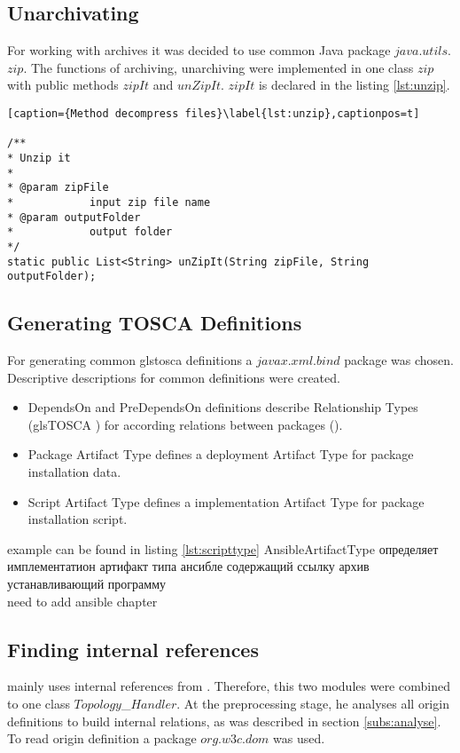 \subsection*{Unarchivating}
For working with archives it was decided to use common Java package $java$.$utils$.$zip$.
The functions of archiving, unarchiving were implemented in one class $zip$ with public methods $zipIt$ and $unZipIt$. $zipIt$ is declared in the listing \ref{lst:unzip}.
\begin{lstlisting}[caption={Method decompress files}\label{lst:unzip},captionpos=t] 

/**
* Unzip it
* 
* @param zipFile
*            input zip file name
* @param outputFolder
*            output folder
*/
static public List<String> unZipIt(String zipFile, String outputFolder);
\end{lstlisting}

\subsection*{Generating TOSCA Definitions}
For generating common gls{tosca} definitions a $javax$.$xml$.$bind$ package was chosen. 
Descriptive descriptions for common definitions were created.
\begin{itemize}
	\item DependsOn and PreDependsOn definitions describe Relationship Types (gls{TOSCA} ) for according relations between packages (). 
	\item Package Artifact Type defines a deployment Artifact Type for package installation data.
	\item Script Artifact Type defines a implementation Artifact Type for package installation script.
\end{itemize}
example can be found in listing \ref{lst:scripttype}
AnsibleArtifactType  определяет имплементатион артифакт типа ансибле содержащий ссылку архив устанавливающий программу 
\\need to add ansible chapter
\fi
\subsection*{Finding internal references}\label{subs:imp_findintref}
 mainly uses internal references from .
Therefore, this two modules were combined to one class $Topology$\_$Handler$.	
At the preprocessing stage, he analyses all origin definitions to build internal relations, as was described in section \ref{subs:analyse}.
To read origin definition a package $org$.$w3c$.$dom$ was used.


